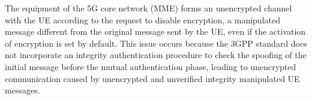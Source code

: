 \documentclass[english]{article}
\begin{document}
The equipment of the 5G core network (MME) forms an unencrypted channel with
the UE according to the request to disable encryption, a manipulated message
different from the original message sent by the UE, even if the activation of
encryption is set by default. This issue occurs because the 3GPP standard does
not incorporate an integrity authentication procedure to check the spoofing of
the initial message before the mutual authentication phase, leading to
unencrypted communication caused by unencrypted and unverified integrity
manipulated UE messages.
\end{document}

